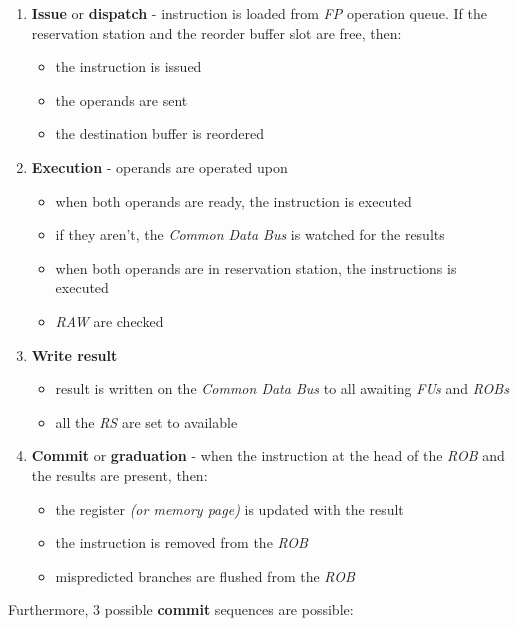 \documentclass[english]{article}
\begin{document}
\begin{enumerate}
  \item \textbf{Issue} or \textbf{dispatch} - instruction is loaded from \textit{FP} operation queue. If the reservation station and the reorder buffer slot are free, then:
        \begin{itemize}
          \item the instruction is issued
          \item the operands are sent
          \item the destination buffer is reordered
        \end{itemize}
  \item \textbf{Execution} - operands are operated upon
        \begin{itemize}
          \item when both operands are ready, the instruction is executed
          \item if they aren't, the \textit{Common Data Bus} is watched for the results
          \item when both operands are in reservation station, the instructions is executed
          \item \textit{RAW} are checked
        \end{itemize}
  \item \textbf{Write result}
        \begin{itemize}
          \item result is written on the \textit{Common Data Bus} to all awaiting \textit{FUs} and \textit{ROBs}
          \item all the \textit{RS} are set to available
        \end{itemize}
  \item \textbf{Commit} or \textbf{graduation} - when the instruction at the head of the \textit{ROB} and the results are present, then:
        \begin{itemize}
          \item the register \textit{(or memory page)} is updated with the result
          \item the instruction is removed from the \textit{ROB}
          \item mispredicted branches are flushed from the \textit{ROB}
        \end{itemize}
\end{enumerate}

Furthermore, \(3\) possible \textbf{commit} sequences are possible:
\end{document}
